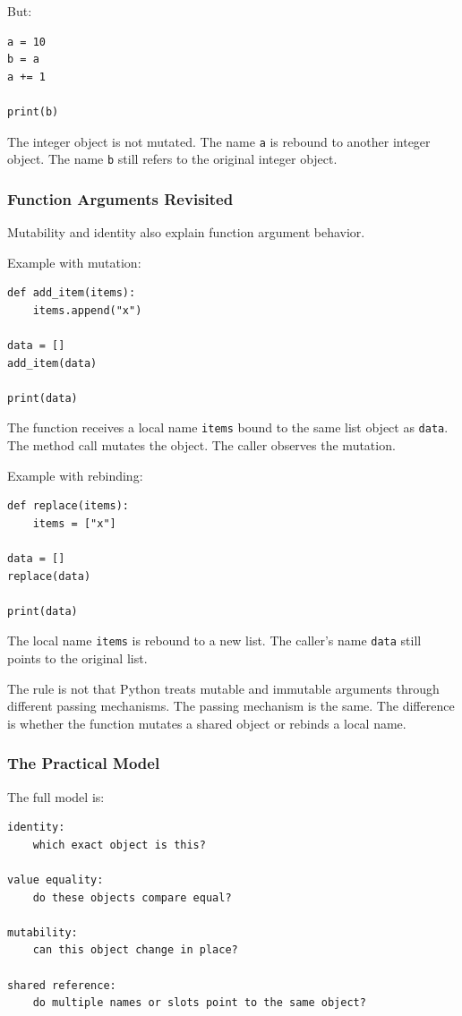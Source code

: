 But:

\begin{verbatim}
a = 10
b = a
a += 1

print(b)
\end{verbatim}

The integer object is not mutated. The name \texttt{a} is rebound to another integer object. The name \texttt{b} still refers to the original integer object.

\subsubsection*{Function Arguments Revisited}

Mutability and identity also explain function argument behavior.

Example with mutation:

\begin{verbatim}
def add_item(items):
    items.append("x")

data = []
add_item(data)

print(data)
\end{verbatim}

The function receives a local name \texttt{items} bound to the same list object as \texttt{data}. The method call mutates the object. The caller observes the mutation.

Example with rebinding:

\begin{verbatim}
def replace(items):
    items = ["x"]

data = []
replace(data)

print(data)
\end{verbatim}

The local name \texttt{items} is rebound to a new list. The caller's name \texttt{data} still points to the original list.

The rule is not that Python treats mutable and immutable arguments through different passing mechanisms. The passing mechanism is the same. The difference is whether the function mutates a shared object or rebinds a local name.

\subsubsection*{The Practical Model}

The full model is:

\begin{verbatim}
identity:
    which exact object is this?

value equality:
    do these objects compare equal?

mutability:
    can this object change in place?

shared reference:
    do multiple names or slots point to the same object?
\end{verbatim}

